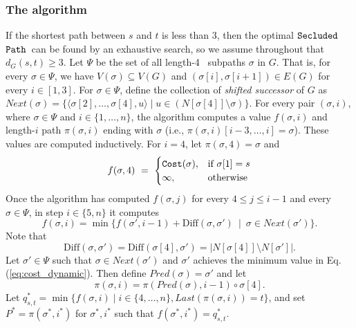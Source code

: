 \documentclass[12pt]{article}
\def\Cost{\mbox{\tt Cost}}
\newcommand{\DIFF}[0]{\mbox{Diff}}
\newcommand{\PP}[0]{$\mbox{\tt Secluded}$ $\mbox{\tt Path}$}
\newcommand{\DegThreeConst}[0]{4}
\def\Cost{\mbox{\tt Cost}}
\begin{document}
\subsubsection{The algorithm}
If the shortest path between $s$ and $t$ is less than $3$, then the optimal \PP\ can be found by an exhaustive search, so we assume throughout that $d_{G}(s,t)\geq 3$. Let $\Psi$ be the set of all length-\DegThreeConst~ subpaths $\sigma$ in $G$. That is, for every $\sigma\in \Psi$, we have $V(\sigma)\subseteq V(G)$ and $(\sigma[i],\sigma[i+1])\in E(G)$ for every $i \in [1,3]$.
For $\sigma \in \Psi$, define the collection of \emph{shifted successor} of $G$ as $Next(\sigma)=\{ \langle \sigma[2], \ldots, \sigma[\DegThreeConst], u \rangle \mid u \in \left(N[\sigma[\DegThreeConst]] \setminus \sigma \right)\}$. For every pair $(\sigma, i)$, where $\sigma \in \Psi$ and $i \in \{1, \ldots,n\}$, the algorithm computes a value $f(\sigma,i)$ and length-$i$ path $\pi(\sigma,i)$ ending with $\sigma$  (i.e., $\pi(\sigma,i)[i-3, \ldots,i]=\sigma$). These values are computed inductively. For $i=\DegThreeConst$, let $\pi(\sigma,\DegThreeConst)=\sigma$ and
$$f(\sigma,\DegThreeConst) ~=~
\begin{cases}
\Cost(\sigma), & \text{if $\sigma[1]=s$}\\
\infty, & \text{otherwise}
\end{cases}
$$
Once the algorithm has computed $f(\sigma,j)$ for every $\DegThreeConst \leq j\leq i-1$ and every $\sigma \in \Psi$, in step $i \in \{5, n\}$ it computes
\begin{equation}
\label{eq:cost_dynamic}
f(\sigma,i)=\min\{ f(\sigma',i-1)+\DIFF(\sigma,\sigma') ~\mid~ \sigma \in Next(\sigma')\}.
\end{equation}
Note that
\begin{equation}
\label{eq:delta}
\DIFF(\sigma,\sigma')=\DIFF(\sigma[\DegThreeConst],\sigma')=|N[\sigma[\DegThreeConst]] \setminus N[\sigma']|.
\end{equation}
Let $\sigma' \in \Psi$ such that $\sigma \in Next(\sigma')$ and $\sigma'$ achieves the minimum value in  Eq. (\ref{eq:cost_dynamic}). Then define $Pred(\sigma)=\sigma'$ and let
\begin{equation}
\label{eq:path_dynamic}
\pi(\sigma,i)=\pi(Pred(\sigma),i-1) \circ \sigma[\DegThreeConst].
\end{equation}
Let $q^{*}_{s,t}=\min\{f(\sigma,i) \mid i\in \{\DegThreeConst, \ldots, n\}, Last(\pi(\sigma,i))=t\}$, and set $P^{*}=\pi(\sigma^{*},i^{*})$ for $\sigma^{*},i^{*}$ such that $f(\sigma^{*},i^{*})=q^{*}_{s,t}$.
\end{document}
